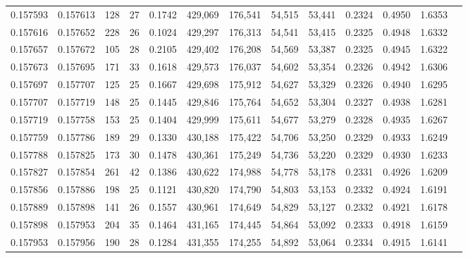 \begin{tabular}{rrrrrrrrrrrrr}
0.157593 & 0.157613 &   128 &  27 &                                     0.1742 & 429,069 & 176,541 &  54,515 &  53,441 & 0.2324 & 0.4950 & 1.6353 \\
0.157616 & 0.157652 &   228 &  26 &                                     0.1024 & 429,297 & 176,313 &  54,541 &  53,415 & 0.2325 & 0.4948 & 1.6332 \\
0.157657 & 0.157672 &   105 &  28 &                                     0.2105 & 429,402 & 176,208 &  54,569 &  53,387 & 0.2325 & 0.4945 & 1.6322 \\
0.157673 & 0.157695 &   171 &  33 &                                     0.1618 & 429,573 & 176,037 &  54,602 &  53,354 & 0.2326 & 0.4942 & 1.6306 \\
0.157697 & 0.157707 &   125 &  25 &                                     0.1667 & 429,698 & 175,912 &  54,627 &  53,329 & 0.2326 & 0.4940 & 1.6295 \\
0.157707 & 0.157719 &   148 &  25 &                                     0.1445 & 429,846 & 175,764 &  54,652 &  53,304 & 0.2327 & 0.4938 & 1.6281 \\
0.157719 & 0.157758 &   153 &  25 &                                     0.1404 & 429,999 & 175,611 &  54,677 &  53,279 & 0.2328 & 0.4935 & 1.6267 \\
0.157759 & 0.157786 &   189 &  29 &                                     0.1330 & 430,188 & 175,422 &  54,706 &  53,250 & 0.2329 & 0.4933 & 1.6249 \\
0.157788 & 0.157825 &   173 &  30 &                                     0.1478 & 430,361 & 175,249 &  54,736 &  53,220 & 0.2329 & 0.4930 & 1.6233 \\
0.157827 & 0.157854 &   261 &  42 &                                     0.1386 & 430,622 & 174,988 &  54,778 &  53,178 & 0.2331 & 0.4926 & 1.6209 \\
0.157856 & 0.157886 &   198 &  25 &                                     0.1121 & 430,820 & 174,790 &  54,803 &  53,153 & 0.2332 & 0.4924 & 1.6191 \\
0.157889 & 0.157898 &   141 &  26 &                                     0.1557 & 430,961 & 174,649 &  54,829 &  53,127 & 0.2332 & 0.4921 & 1.6178 \\
0.157898 & 0.157953 &   204 &  35 &                                     0.1464 & 431,165 & 174,445 &  54,864 &  53,092 & 0.2333 & 0.4918 & 1.6159 \\
0.157953 & 0.157956 &   190 &  28 &                                     0.1284 & 431,355 & 174,255 &  54,892 &  53,064 & 0.2334 & 0.4915 & 1.6141 \\

\end{tabular}
